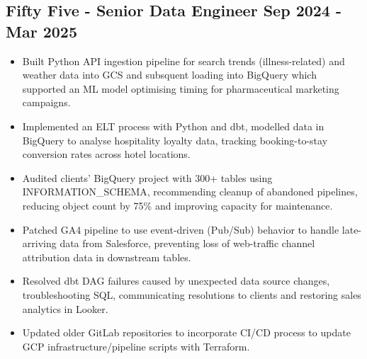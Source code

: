 \documentclass[a4paper, 10pt]{article}
\begin{document}
\subsection*{\textbf{Fifty Five - Senior Data Engineer} \hfill  Sep 2024 - Mar 2025}
\begin{itemize}[noitemsep]
    \item Built Python API ingestion pipeline for search trends (illness-related) and weather data into GCS and subsquent loading into BigQuery which supported an ML model optimising timing for pharmaceutical marketing campaigns.
    \item Implemented an ELT process with Python and dbt, modelled data in BigQuery to analyse hospitality loyalty data, tracking booking-to-stay conversion rates across hotel locations.
    \item Audited clients' BigQuery project with 300+ tables using INFORMATION\_SCHEMA, recommending cleanup of abandoned pipelines, reducing object count by 75\% and improving capacity for maintenance.
    \item Patched GA4 pipeline to use event-driven (Pub/Sub) behavior to handle late-arriving data from Salesforce, preventing loss of web-traffic channel attribution data in downstream tables.
    \item Resolved dbt DAG failures caused by unexpected data source changes, troubleshooting SQL, communicating resolutions to clients and restoring sales analytics in Looker.
    \item Updated older GitLab repositories to incorporate CI/CD process to update GCP infrastructure/pipeline scripts with Terraform.
\end{itemize}
\end{document}
